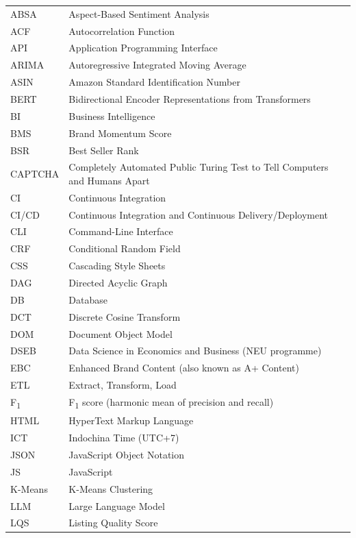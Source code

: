 \begin{center}
\begin{longtable}{p{3.2cm}p{10.6cm}}
  ABSA     & Aspect-Based Sentiment Analysis \\
  ACF      & Autocorrelation Function \\
  API      & Application Programming Interface \\
  ARIMA    & Autoregressive Integrated Moving Average \\
  ASIN     & Amazon Standard Identification Number \\
  BERT     & Bidirectional Encoder Representations from Transformers \\
  BI       & Business Intelligence \\
  BMS      & Brand Momentum Score \\
  BSR      & Best Seller Rank \\
  CAPTCHA  & Completely Automated Public Turing Test to Tell Computers and Humans Apart \\
  CI       & Continuous Integration \\
  CI/CD    & Continuous Integration and Continuous Delivery/Deployment \\
  CLI      & Command-Line Interface \\
  CRF      & Conditional Random Field \\
  CSS      & Cascading Style Sheets \\
  DAG      & Directed Acyclic Graph \\
  DB       & Database \\
  DCT      & Discrete Cosine Transform \\
  DOM      & Document Object Model \\
  DSEB     & Data Science in Economics and Business (NEU programme) \\
  EBC      & Enhanced Brand Content (also known as A+ Content) \\
  ETL      & Extract, Transform, Load \\
  F\textsubscript{1} & F\textsubscript{1} score (harmonic mean of precision and recall) \\
  HTML     & HyperText Markup Language \\
  ICT      & Indochina Time (UTC+7) \\
  JSON     & JavaScript Object Notation \\
  JS       & JavaScript \\
  K-Means  & K-Means Clustering \\
  LLM      & Large Language Model \\
  LQS      & Listing Quality Score \\

\end{longtable}
\end{center}
